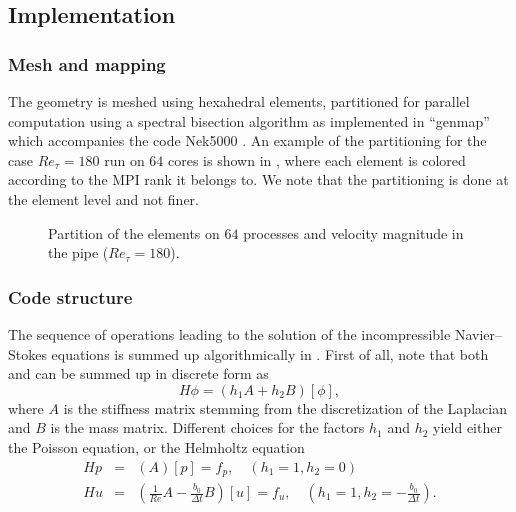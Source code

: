 \documentclass{sig-alternate}
\begin{document}


\subsection{Implementation}
\label{sec:implementation}

\subsubsection{Mesh and mapping}
\label{sec:code}
The geometry is meshed using hexahedral elements, partitioned for parallel
computation using a spectral bisection algorithm as implemented in ``genmap''
which accompanies the code Nek5000 \cite{argonne:nekdoc}. An example of the
partitioning for the case $Re_{\tau} = 180$ run on $64$ cores is shown in , where each element is colored according to the MPI rank it belongs to. We note that the partitioning is done at the element level and not finer.
\begin{figure}
  \centering
  \caption{Partition of the elements on $64$ processes and velocity magnitude in the pipe ($Re_{\tau}=180$).}
  \label{fig:partition}
\end{figure}
 
\subsubsection{Code structure}
\label{sec:code}

The sequence of operations leading to the solution of the incompressible
Navier--Stokes equations is summed up algorithmically in .  
First of all, note that both  and  can be summed up in discrete form as
$$H \phi=(h_1 A+h_2 B)[\phi],$$
where $A$ is the stiffness matrix stemming from the discretization of the Laplacian and $B$ is the mass matrix. 
Different choices for the factors $h_1$ and $h_2$ yield either the Poisson equation, or the Helmholtz equation
\begin{eqnarray}
Hp &=& (A)[p]=f_p, \quad (h_1=1, h_2=0)\\
Hu &=&(\frac{1}{Re}A -\frac{b_0}{\Delta t} B )[u]=f_u, \quad (h_1=1, h_2=-\frac{b_0}{\Delta t}).
\end{eqnarray}
\end{document}
